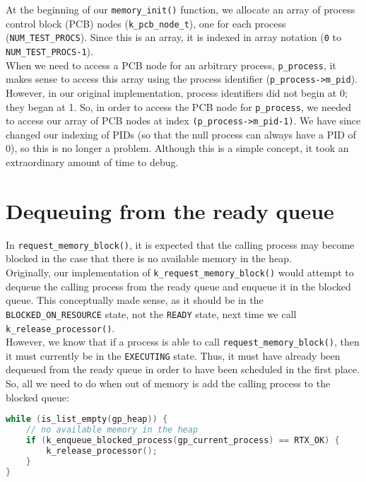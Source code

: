 \documentclass[12pt]{report}
\begin{document}
At the beginning of our \texttt{memory_init()} function, we allocate an array of process control block (PCB) nodes (\texttt{k_pcb_node_t}), one for each process (\texttt{NUM_TEST_PROCS}). Since this is an array, it is indexed in array notation (\texttt{0} to \texttt{NUM_TEST_PROCS-1}).\\

When we need to access a PCB node for an arbitrary process, \texttt{p_process}, it makes sense to access this array using the process identifier (\texttt{p_process->m_pid}). However, in our original implementation, process identifiers did not begin at 0; they began at 1. So, in order to access the PCB node for \texttt{p_process}, we needed to access our array of PCB nodes at index \texttt{(p_process->m_pid-1)}. We have since changed our indexing of PIDs (so that the null process can always have a PID of 0), so this is no longer a problem. Although this is a simple concept, it took an extraordinary amount of time to debug.

\section{Dequeuing from the ready queue}

In \texttt{request_memory_block()}, it is expected that the calling process may become blocked in the case that there is no available memory in the heap.\\

Originally, our implementation of \texttt{k_request_memory_block()} would attempt to dequeue the calling process from the ready queue and enqueue it in the blocked queue. This conceptually made sense, as it should be in the \texttt{BLOCKED_ON_RESOURCE} state, not the \texttt{READY} state, next time we call \texttt{k_release_processor()}.\\

However, we know that if a process is able to call \texttt{request_memory_block()}, then it must currently be in the \texttt{EXECUTING} state. Thus, it must have already been dequeued from the ready queue in order to have been scheduled in the first place. So, all we need to do when out of memory is add the calling process to the blocked queue:

\begin{minipage}{\textwidth}
\begin{lstlisting}[language=C]
while (is_list_empty(gp_heap)) {
    // no available memory in the heap
    if (k_enqueue_blocked_process(gp_current_process) == RTX_OK) {
        k_release_processor();
    }
}
\end{lstlisting}
\end{minipage}
\end{document}
